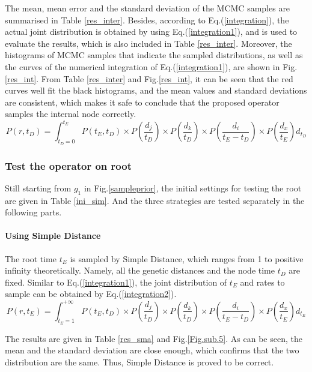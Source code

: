 \documentclass{bmcart}
\begin{document}
The mean, mean error and the standard deviation of the MCMC samples are summarised in Table \ref{res_inter}. Besides, according to Eq.(\ref{integration}), the actual joint distribution is obtained by using Eq.(\ref{integration1}), and is used to evaluate the results, which is also included in Table \ref{res_inter}. Moreover, the histograms of MCMC samples that indicate the sampled distributions, as well as the curves of the numerical integration of Eq.(\ref{integration1}), are shown in Fig.\ref{res_int}. From Table \ref{res_inter} and Fig.\ref{res_int}, it can be seen that the red curves well fit the black histograms, and the mean values and standard deviations are consistent, which makes it safe to conclude that the proposed operator samples the internal node correctly.
\begin{equation}
\label{integration1}
P(r,{t_D}) = \int_{{t_D} = 0}^{{t_E}} {P({t_E},{t_D}) \times P(\frac{{{d_j}}}{{{t_D}}}) \times P(\frac{{{d_k}}}{{{t_D}}}) \times P(\frac{{{d_i}}}{{{t_E} - {t_D}}}) \times P(\frac{{{d_x}}}{{{t_E}}}){d_{t_D}}}
\end{equation}
\subsubsection*{Test the operator on root}
Still starting from $g_1$ in Fig.\ref{sampleprior}, the initial settings for testing the root are given in Table \ref{ini_sim}. And the three strategies are tested separately in the following parts.

\paragraph*{Using Simple Distance}

The root time $t_E$ is sampled by Simple Distance, which ranges from 1 to positive infinity theoretically. Namely, all the genetic distances and the node time $t_D$  are fixed. Similar to Eq.(\ref{integration1}), the joint distribution of $t_E$ and rates to sample can be obtained by Eq.(\ref{integration2}).
\begin{equation}
\label{integration2}
P(r,{t_E}) = \int_{{t_E} = 1}^{ + \infty } {P({t_E},{t_D}) \times P(\frac{{{d_j}}}{{{t_D}}}) \times P(\frac{{{d_k}}}{{{t_D}}}) \times P(\frac{{{d_i}}}{{{t_E} - {t_D}}}) \times P(\frac{{{d_x}}}{{{t_E}}}){d_{t_E}}}
\end{equation}

The results are given in Table \ref{res_sma} and Fig.\ref{Fig.sub.5}. As can be seen, the mean and the standard deviation are close enough, which confirms that the two distribution are the same. Thus, Simple Distance is proved to be correct.
\end{document}
